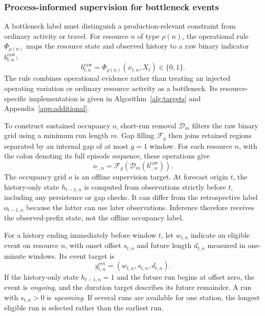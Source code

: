 \documentclass[a4paper,fleqn]{cas-dc}
\begin{document}
\subsubsection{Process-informed supervision for bottleneck events}

A bottleneck label must distinguish a production-relevant constraint from ordinary activity or travel. For resource $n$ of type $\rho(n)$, the operational rule $\Phi_{\rho(n)}$ maps the resource state and observed history to a raw binary indicator $b^{\mathrm{raw}}_{t,n}$:
\begin{equation}
b^{\mathrm{raw}}_{t,n}=\Phi_{\rho(n)}(x_{t,n},X_t)\in\{0,1\}.
\end{equation}
The rule combines operational evidence rather than treating an injected operating variation or ordinary resource activity as a bottleneck. Its resource-specific implementation is given in Algorithm~\ref{alg:targets} and Appendix~\ref{app:additional}.

To construct sustained occupancy $o$, short-run removal $\mathcal{D}_{m}$ filters the raw binary grid using a minimum run length $m$. Gap filling $\mathcal{F}_{g}$ then joins retained regions separated by an internal gap of at most $g=1$ window. For each resource $n$, with the colon denoting its full episode sequence, these operations give
\begin{equation}
o_{:,n}=\mathcal{F}_{g}\!\left(\mathcal{D}_{m}
\left(b^{\mathrm{raw}}_{:,n}\right)\right).
\end{equation}
The occupancy grid $o$ is an offline supervision target. At forecast origin $t$, the history-only state $h_{t-1,n}$ is computed from observations strictly before $t$, including any persistence or gap checks. It can differ from the retrospective label $o_{t-1,n}$ because the latter can use later observations. Inference therefore receives the observed-prefix state, not the offline occupancy label.

For a history ending immediately before window $t$, let $w_{t,n}$ indicate an eligible event on resource $n$, with onset offset $s_{t,n}$ and future length $d_{t,n}$ measured in one-minute windows. Its event target is
\begin{equation}
y_{t,n}^{\mathrm{evt}}=(w_{t,n},s_{t,n},d_{t,n}).
\end{equation}
If the history-only state $h_{t-1,n}=1$ and the future run begins at offset zero, the event is \emph{ongoing}, and the duration target describes its future remainder. A run with $s_{t,n}>0$ is \emph{upcoming}. If several runs are available for one station, the longest eligible run is selected rather than the earliest run.
\end{document}
